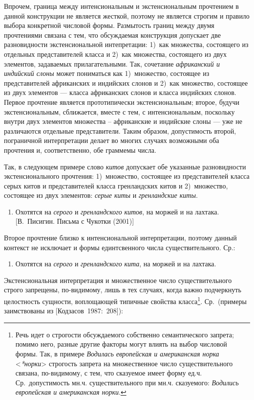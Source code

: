 Впрочем, граница между интенсиональным и экстенсиональным прочтением в
данной конструкции не является жесткой, поэтому не является строгим и
правило выбора конкретной числовой формы. Размытость границ между двумя
прочтениями связана с тем, что обсуждаемая конструкция допускает две
разновидности экстенсиональной интепретации: 1)~как множества,
состоящего из отдельных представителей класса и 2)~как множества,
состоящего из двух элементов, задаваемых прилагательными. Так, сочетание
\textit{африканский и индийский слоны} может пониматься как 1)~множество,
состоящее из представителей африканских и индийских слонов и 2)~как
множество, состоящее из двух элементов --- класса африканских слонов и
класса индийских слонов. Первое прочтение является прототипически
экстенсиональным; второе, будучи экстенсиональным, сближается, вместе с
тем, с интенсиональным, поскольку внутри двух элементов множества --
африканские и индийские слоны --- уже не различаются отдельные
представители. Таким образом, допустимость второй, пограничной
интерпретации делает во многих случаях возможными оба прочтения и,
соответственно, обе граммемы числа.

Так, в следующем примере слово \textit{китов} допускает обе указанные
разновидности экстенсионального прочтения: 1)~множество, состоящее из
представителей класса серых китов и представителей класса гренландских
китов и 2)~множество, состоящее из двух элементов: \textit{серые киты} и
\textit{гренландские киты}.

\begin{enumerate}
\def\labelenumi{(\arabic{enumi})}
\setcounter{enumi}{149}
\item
  Охотятся на \textit{серого} и \textit{гренландского} \textit{китов}, на
  моржей и на лахтака. {[}В.~Писигин. Письма с Чукотки (2001){]}
\end{enumerate}

Второе прочтение близко к интенсиональной интерпретации, поэтому данный
контекст не исключает и формы единтсвенного числа существительного. Ср.:

\begin{enumerate}
\def\labelenumi{(\arabic{enumi})}
\setcounter{enumi}{150}
\item
  Охотятся на \textit{серого} и \textit{гренландского} \textit{кита}, на
  моржей и на лахтака.
\end{enumerate}

Экстенсиональная интерпретация и множественное число существительного
строго запрещены, по-видимому, лишь в тех случаях, когда важно
подчеркнуть целостность сущности, воплощающей типичные свойства
класса\footnote{Речь идет о строгости обсуждаемого собственно
  семантического запрета; помимо него, разные другие факторы могут
  влиять на выбор числовой формы. Так, в примере \textit{Водилась
  европейская и американская норка}
  \textless{}\textit{*норки}\textgreater{} строгость запрета на
  множественное число существительного связана, по-видимому, с тем, что
  сказуемое имеет форму ед.ч. Ср.~допустимость мн.ч. существительного
  при мн.ч. сказуемого: \textit{Водились европейская и американская
  норки}.}. Ср.~(примеры заимствованы из {[}Кодзасов~1987:~208{]}):

